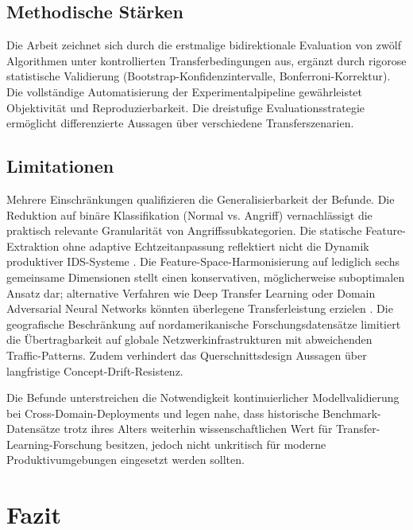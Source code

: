 \documentclass[11pt,a4paper]{article}
\begin{document}
    \subsection{Methodische Stärken}

    Die Arbeit zeichnet sich durch die erstmalige bidirektionale Evaluation von zwölf Algorithmen unter kontrollierten Transferbedingungen aus, ergänzt durch rigorose statistische Validierung (Bootstrap-Konfidenzintervalle, Bonferroni-Korrektur). Die vollständige Automatisierung der Experimentalpipeline gewährleistet Objektivität und Reproduzierbarkeit. Die dreistufige Evaluationsstrategie ermöglicht differenzierte Aussagen über verschiedene Transferszenarien.

    \subsection{Limitationen}

    Mehrere Einschränkungen qualifizieren die Generalisierbarkeit der Befunde. Die Reduktion auf binäre Klassifikation (Normal vs. Angriff) vernachlässigt die praktisch relevante Granularität von Angriffssubkategorien. Die statische Feature-Extraktion ohne adaptive Echtzeitanpassung reflektiert nicht die Dynamik produktiver IDS-Systeme \parencite{Vinayakumar2019}. Die Feature-Space-Harmonisierung auf lediglich sechs gemeinsame Dimensionen stellt einen konservativen, möglicherweise suboptimalen Ansatz dar; alternative Verfahren wie Deep Transfer Learning oder Domain Adversarial Neural Networks könnten überlegene Transferleistung erzielen \parencite{Goodfellow2016}. Die geografische Beschränkung auf nordamerikanische Forschungsdatensätze limitiert die Übertragbarkeit auf globale Netzwerkinfrastrukturen mit abweichenden Traffic-Patterns. Zudem verhindert das Querschnittsdesign Aussagen über langfristige Concept-Drift-Resistenz.

    Die Befunde unterstreichen die Notwendigkeit kontinuierlicher Modellvalidierung bei Cross-Domain-Deployments und legen nahe, dass historische Benchmark-Datensätze trotz ihres Alters weiterhin wissenschaftlichen Wert für Transfer-Learning-Forschung besitzen, jedoch nicht unkritisch für moderne Produktivumgebungen eingesetzt werden sollten.

    \section{Fazit}
\end{document}
